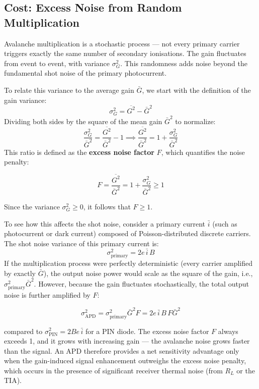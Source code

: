 \subsection{Cost: Excess Noise from Random Multiplication}

Avalanche multiplication is a stochastic process — not every primary carrier triggers exactly the same number of secondary ionisations. The gain fluctuates from event to event, with variance $\sigma_G^2$. This randomness adds noise beyond the fundamental shot noise of the primary photocurrent. 

To relate this variance to the average gain $\bar{G}$, we start with the definition of the gain variance:
\begin{equation*}
    \sigma_G^2 = \overline{G^2} - \bar{G}^2
\end{equation*}
Dividing both sides by the square of the mean gain $\bar{G}^2$ to normalize:
\begin{equation*}
    \frac{\sigma_G^2}{\bar{G}^2} = \frac{\overline{G^2}}{\bar{G}^2} - 1 \implies \frac{\overline{G^2}}{\bar{G}^2} = 1 + \frac{\sigma_G^2}{\bar{G}^2}
\end{equation*}
This ratio is defined as the \textbf{excess noise factor} $F$, which quantifies the noise penalty:
\begin{keyresult}
    \begin{equation}
        F = \frac{\overline{G^2}}{\bar{G}^2} = 1 + \frac{\sigma_G^2}{\bar{G}^2} \geq 1
    \end{equation}
\end{keyresult}
Since the variance $\sigma_G^2 \geq 0$, it follows that $F \geq 1$. 

To see how this affects the shot noise, consider a primary current $\bar{i}$ (such as photocurrent or dark current) composed of Poisson-distributed discrete carriers. The shot noise variance of this primary current is:
\begin{equation*}
    \sigma_\text{primary}^2 = 2e\,\bar{i}\,B
\end{equation*}
If the multiplication process were perfectly deterministic (every carrier amplified by exactly $\bar{G}$), the output noise power would scale as the square of the gain, i.e., $\sigma_\text{primary}^2 \bar{G}^2$. However, because the gain fluctuates stochastically, the total output noise is further amplified by $F$:
\begin{keyresult}
    \begin{equation}
        \sigma_\text{APD}^2 = \sigma_\text{primary}^2 \bar{G}^2 F = 2e\,\bar{i}\,B\,F\bar{G}^2
    \end{equation}
\end{keyresult}
compared to $\sigma_\text{PIN}^2 = 2Be\,\bar{i}$ for a PIN diode. The excess noise factor $F$ always exceeds 1, and it grows with increasing gain — the avalanche noise grows faster than the signal. An APD therefore provides a net sensitivity advantage only when the gain-induced signal enhancement outweighs the excess noise penalty, which occurs in the presence of significant receiver thermal noise (from $R_L$ or the TIA).

